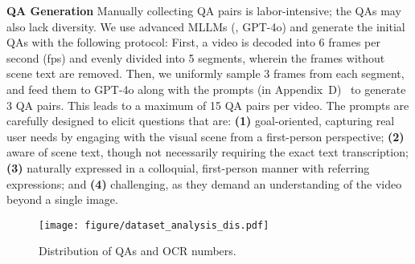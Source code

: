 \noindent\textbf{QA Generation}
Manually collecting QA pairs is labor-intensive; the QAs may also lack diversity. We use advanced MLLMs (\ie, GPT-4o) and generate the initial QAs with the following protocol: First, a video is decoded into 6 frames per second (fps) and evenly divided into 5 segments, wherein the frames without scene text are removed. Then, we uniformly sample 3 frames from each segment, and feed them to GPT-4o along with the prompts (in Appendix~{\color{red}D})~%
to generate 3 QA pairs. This leads to a maximum of 15 QA pairs per video. The prompts are carefully designed to elicit questions that are:  
\textbf{(1)} goal-oriented, capturing real user needs by engaging with the visual scene from a first-person perspective;  
\textbf{(2)} aware of scene text, though not necessarily requiring the exact text transcription;  
\textbf{(3)} naturally expressed in a colloquial, first-person manner with referring expressions; and  
\textbf{(4)} challenging, as they demand an understanding of the video beyond a single image.


\begin{figure*}[t!]
\centering
\texttt{[image: figure/dataset\_analysis\_dis.pdf]}
\vspace{-0.5cm}
\caption{Distribution of QAs and OCR numbers.} 
\label{fig:data_dis}
\vspace{-0.2cm}
\end{figure*}



